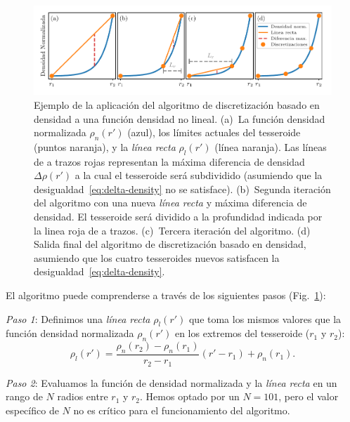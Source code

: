 \begin{figure}
\centering
\includegraphics[width=\linewidth]{figs/tesseroids-variable-density/density-based-discretization-algorithm.pdf}
\caption{
    Ejemplo de la aplicación del algoritmo de discretización basado en densidad
    a una función densidad no lineal.
    (a)~La función densidad normalizada $\rho_n(r')$ (azul), los límites
    actuales del tesseroide (puntos naranja), y la \emph{línea recta}
    $\rho_l(r')$ (línea naranja).
    Las líneas de a trazos rojas representan la máxima diferencia de densidad
    $\Delta \rho (r')$ a la cual el tesseroide será subdividido (asumiendo que
    la desigualdad~\ref{eq:delta-density} no se satisface).
    (b)~Segunda iteración del algoritmo con una nueva \emph{línea recta}
    y máxima diferencia de densidad. El tesseroide será dividido a la
    profundidad indicada por la linea roja de a trazos.
    (c)~Tercera iteración del algoritmo.
    (d)~ Salida final del algoritmo de discretización basado en densidad,
    asumiendo que los cuatro tesseroides nuevos satisfacen la
    desigualdad~\ref{eq:delta-density}.
}
\label{fig:density-discretization-algorithm}
\end{figure}


El algoritmo puede comprenderse a través de los siguientes pasos
(Fig.~\ref{fig:density-discretization-algorithm}):

\textit{Paso 1}:
Definimos una \emph{línea recta} $\rho_l(r')$ que toma los mismos valores que
la función densidad normalizada $\rho_n(r')$ en los extremos del tesseroide
($r_1$ y $r_2$):
%
\begin{equation}
    \rho_l(r') =
    \frac{ \rho_n(r_2) - \rho_n(r_1) }{ r_2 - r_1 } (r' - r_1) + \rho_n(r_1).
    \label{eq:density-reference-line}
\end{equation}

\textit{Paso 2}:
Evaluamos la función de densidad normalizada y la \emph{línea recta} en un
rango de $N$ radios entre $r_1$ y $r_2$. Hemos optado por un $N = 101$, pero el
valor específico de $N$ no es crítico para el funcionamiento del algoritmo.

